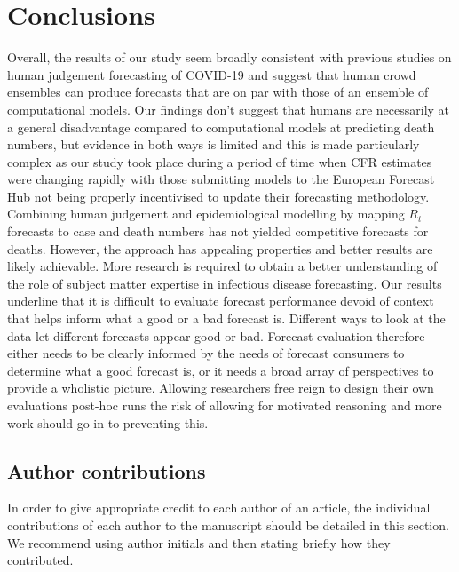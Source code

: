 \documentclass[10pt,a4paper,twocolumn]{article}
\begin{document}
\section*{Conclusions}

Overall, the results of our study seem broadly consistent with previous studies on human judgement forecasting of COVID-19 and suggest that human crowd ensembles can produce forecasts that are on par with those of an ensemble of computational models. Our findings don't suggest that humans are necessarily at a general disadvantage compared to computational models at predicting death numbers, but evidence in both ways is limited and this is made particularly complex as our study took place during a period of time when CFR estimates were changing rapidly with those submitting models to the European Forecast Hub not being properly incentivised to update their forecasting methodology. Combining human judgement and epidemiological modelling by mapping $R_t$ forecasts to case and death numbers has not yielded competitive forecasts for deaths. However, the approach has appealing properties and better results are likely achievable. More research is required to obtain a better understanding of the role of subject matter expertise in infectious disease forecasting. Our results underline that it is difficult to evaluate forecast performance devoid of context that helps inform what a good or a bad forecast is. Different ways to look at the data let different forecasts appear good or bad. Forecast evaluation therefore either needs to be clearly informed by the needs of forecast consumers to determine what a good forecast is, or it needs a broad array of perspectives to provide a wholistic picture. Allowing researchers free reign to design their own evaluations post-hoc runs the risk of allowing for motivated reasoning and more work should go in to preventing this.









\subsection*{Author contributions}
In order to give appropriate credit to each author of an article, the individual
contributions of each author to the manuscript should be detailed in this section. We
recommend using author initials and then stating briefly how they contributed.
\end{document}
